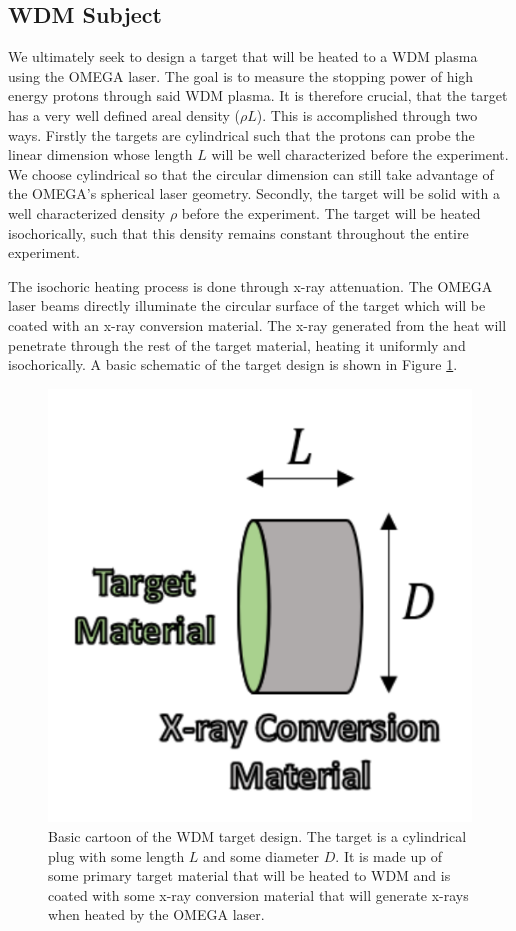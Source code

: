 \subsection{WDM Subject}

We ultimately seek to design a target that will be heated to a WDM plasma using the OMEGA laser. The goal is to measure the stopping power of high energy protons through said WDM plasma. It is therefore crucial, that the target has a very well defined areal density ($\rho L$). This is accomplished through two ways. Firstly the targets are cylindrical such that the protons can probe the linear dimension whose length $L$ will be well characterized before the experiment. We choose cylindrical so that the circular dimension can still take advantage of the OMEGA's spherical laser geometry. Secondly, the target will be solid with a well characterized density $\rho$ before the experiment. The target will be heated isochorically, such that this density remains constant throughout the entire experiment.   

The isochoric heating process is done through x-ray attenuation. The OMEGA laser beams directly illuminate the circular surface of the target which will be coated with an x-ray conversion material. The x-ray generated from the heat will penetrate through the rest of the target material, heating it uniformly and isochorically. A basic schematic of the target design is shown in Figure \ref{fig:wdmTargetCartoon}. 

\begin{figure}[h!]
    \centering
    \includegraphics[scale=0.8]{Figures/wdmTargetCartoon.pdf}
    \caption[WDM Target Cartoon]{Basic cartoon of the WDM target design. The target is a cylindrical plug with some length $L$ and some diameter $D$. It is made up of some primary target material that will be heated to WDM and is coated with some x-ray conversion material that will generate x-rays when heated by the OMEGA laser.}
    \label{fig:wdmTargetCartoon}
\end{figure}

